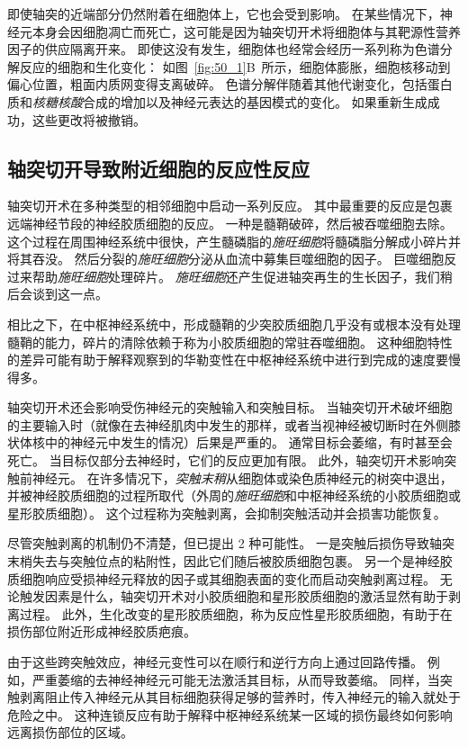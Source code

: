 即使轴突的近端部分仍然附着在细胞体上，它也会受到影响。
在某些情况下，神经元本身会因细胞凋亡而死亡，这可能是因为轴突切开术将细胞体与其靶源性营养因子的供应隔离开来。
即使这没有发生，细胞体也经常会经历一系列称为色谱分解反应的细胞和生化变化：
如图~\ref{fig:50_1}B~所示，细胞体膨胀，细胞核移动到偏心位置，粗面内质网变得支离破碎。
色谱分解伴随着其他代谢变化，包括蛋白质和\textit{核糖核酸}合成的增加以及神经元表达的基因模式的变化。
如果重新生成成功，这些更改将被撤销。



\subsection{轴突切开导致附近细胞的反应性反应}

轴突切开术在多种类型的相邻细胞中启动一系列反应。
其中最重要的反应是包裹远端神经节段的神经胶质细胞的反应。
一种是髓鞘破碎，然后被吞噬细胞去除。
这个过程在周围神经系统中很快，产生髓磷脂的\textit{施旺细胞}将髓磷脂分解成小碎片并将其吞没。
然后分裂的\textit{施旺细胞}分泌从血流中募集巨噬细胞的因子。
巨噬细胞反过来帮助\textit{施旺细胞}处理碎片。
\textit{施旺细胞}还产生促进轴突再生的生长因子，我们稍后会谈到这一点。


相比之下，在中枢神经系统中，形成髓鞘的少突胶质细胞几乎没有或根本没有处理髓鞘的能力，碎片的清除依赖于称为小胶质细胞的常驻吞噬细胞。
这种细胞特性的差异可能有助于解释观察到的华勒变性在中枢神经系统中进行到完成的速度要慢得多。


轴突切开术还会影响受伤神经元的突触输入和突触目标。
当轴突切开术破坏细胞的主要输入时（就像在去神经肌肉中发生的那样，或者当视神经被切断时在外侧膝状体核中的神经元中发生的情况）后果是严重的。
通常目标会萎缩，有时甚至会死亡。
当目标仅部分去神经时，它们的反应更加有限。
此外，轴突切开术影响突触前神经元。
在许多情况下，\textit{突触末稍}从细胞体或染色质神经元的树突中退出，并被神经胶质细胞的过程所取代（外周的\textit{施旺细胞}和中枢神经系统的小胶质细胞或星形胶质细胞）。
这个过程称为突触剥离，会抑制突触活动并会损害功能恢复。


尽管突触剥离的机制仍不清楚，但已提出 2 种可能性。
一是突触后损伤导致轴突末梢失去与突触位点的粘附性，因此它们随后被胶质细胞包裹。
另一个是神经胶质细胞响应受损神经元释放的因子或其细胞表面的变化而启动突触剥离过程。
无论触发因素是什么，轴突切开术对小胶质细胞和星形胶质细胞的激活显然有助于剥离过程。
此外，生化改变的星形胶质细胞，称为反应性星形胶质细胞，有助于在损伤部位附近形成神经胶质疤痕。


由于这些跨突触效应，神经元变性可以在顺行和逆行方向上通过回路传播。
例如，严重萎缩的去神经神经元可能无法激活其目标，从而导致萎缩。
同样，当突触剥离阻止传入神经元从其目标细胞获得足够的营养时，传入神经元的输入就处于危险之中。
这种连锁反应有助于解释中枢神经系统某一区域的损伤最终如何影响远离损伤部位的区域。



